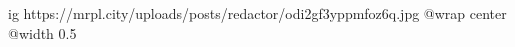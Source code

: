  
 
 
 
 

\ifcmt
  ig https://mrpl.city/uploads/posts/redactor/odi2gf3yppmfoz6q.jpg
  @wrap center
  @width 0.5
\fi
